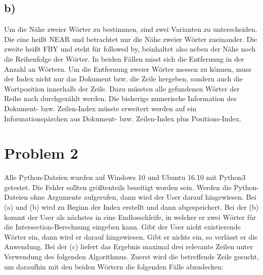 \documentclass[
     11pt,         %
     a4paper,      %
     oneside,
     ]{article}
\begin{document}
\subsection{b)}
Um die Nähe zweier Wörter zu bestimmen, sind zwei Varianten zu unterscheiden. Die eine heißt NEAR und betrachtet nur die Nähe zweier Wörter zueinander. Die zweite heißt FBY und steht für followed by, beinhaltet also neben der Nähe noch die Reihenfolge der Wörter. In beiden Fällen misst sich die Entfernung in der Anzahl an Wörtern.\newline
\newline
Um die Entfernung zweier Wörter messen zu können, muss der Index nicht nur das Dokument bzw. die Zeile hergeben, sondern auch die Wortposition innerhalb der Zeile. Dazu müssten alle gefundenen Wörter der Reihe nach durchgezählt werden. Die bisherige numerische Information des Dokument- bzw. Zeilen-Index müsste erweitert werden auf ein Informationspärchen aus Dokument- bzw. Zeilen-Index plus Positions-Index.

\section{Problem 2}\label{sec:problem2}
Alle Python-Dateien wurden auf Windows 10 und Ubuntu 16.10 mit Python3 getestet. Die Fehler sollten größtenteils beseitigt worden sein. Werden die Python-Dateien ohne Argumente aufgerufen, dann wird der User darauf hingewiesen. Bei (a) und (b) wird zu Beginn der Index erstellt und dann abgespeichert. Bei der (b) kommt der User als nächstes in eine Endlosschleife, in welcher er zwei Wörter für die Intersection-Berechnung eingeben kann. Gibt der User nicht existierende Wörter ein, dann wird er darauf hingewiesen. Gibt er nichts ein, so verlässt er die Anwendung.\newline
\newline
Bei der (c) liefert das Ergebnis maximal drei relevante Zeilen unter Verwendung des folgenden Algorithmus. Zuerst wird die betreffende Zeile gesucht, um daraufhin mit den beiden Wörtern die folgenden Fälle abzudecken:\newline
\newline
\end{document}
